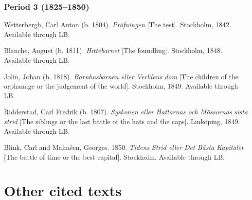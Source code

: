 \documentclass[output=paper, colorlinks, citecolor=brown]{langscibook}
\begin{document}
\subsubsection*{Period 3 (1825–1850)}
\begin{description}[font=\normalfont]\sloppy
\item[3A:] Wetterbergh, Carl Anton (b. 1804). \textit{Pröfningen} [The test]. Stockholm, 1842. Available through LB.
\item[3B:] Blanche, August (b. 1811). \textit{Hittebarnet} [The foundling]. Stockholm, 1848. Available through LB.
\item[3C:] Jolin, Johan (b. 1818). \textit{Barnhusbarnen eller Verldens dom} [The children of the orphanage or the judgement of the world]. Stockholm, 1849. Available through LB.
\item[3D:] Ridderstad, Carl Fredrik (b. 1807). \textit{Syskonen eller Hattarnas och Mössornas sista strid} [The siblings or the last battle of the hats and the caps]. Linköping, 1849. Available through LB.
\item[3E:] Blink, Carl and Malméen, Georges. 1850. \textit{Tidens Strid eller Det Bästa Kapitalet} [The battle of time or the best capital]. Stockholm. Available through LB.
\end{description}
 
\section*{Other cited texts}
\end{document}

